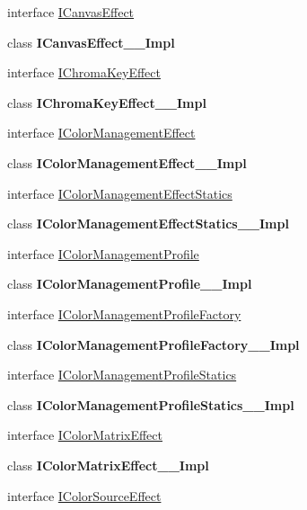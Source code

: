 \begin{DoxyCompactItemize}
\item 
interface \hyperlink{interface_microsoft_1_1_graphics_1_1_canvas_1_1_effects_1_1_i_canvas_effect}{I\+Canvas\+Effect}
\item 
class {\bfseries I\+Canvas\+Effect\+\_\+\+\_\+\+Impl}
\item 
interface \hyperlink{interface_microsoft_1_1_graphics_1_1_canvas_1_1_effects_1_1_i_chroma_key_effect}{I\+Chroma\+Key\+Effect}
\item 
class {\bfseries I\+Chroma\+Key\+Effect\+\_\+\+\_\+\+Impl}
\item 
interface \hyperlink{interface_microsoft_1_1_graphics_1_1_canvas_1_1_effects_1_1_i_color_management_effect}{I\+Color\+Management\+Effect}
\item 
class {\bfseries I\+Color\+Management\+Effect\+\_\+\+\_\+\+Impl}
\item 
interface \hyperlink{interface_microsoft_1_1_graphics_1_1_canvas_1_1_effects_1_1_i_color_management_effect_statics}{I\+Color\+Management\+Effect\+Statics}
\item 
class {\bfseries I\+Color\+Management\+Effect\+Statics\+\_\+\+\_\+\+Impl}
\item 
interface \hyperlink{interface_microsoft_1_1_graphics_1_1_canvas_1_1_effects_1_1_i_color_management_profile}{I\+Color\+Management\+Profile}
\item 
class {\bfseries I\+Color\+Management\+Profile\+\_\+\+\_\+\+Impl}
\item 
interface \hyperlink{interface_microsoft_1_1_graphics_1_1_canvas_1_1_effects_1_1_i_color_management_profile_factory}{I\+Color\+Management\+Profile\+Factory}
\item 
class {\bfseries I\+Color\+Management\+Profile\+Factory\+\_\+\+\_\+\+Impl}
\item 
interface \hyperlink{interface_microsoft_1_1_graphics_1_1_canvas_1_1_effects_1_1_i_color_management_profile_statics}{I\+Color\+Management\+Profile\+Statics}
\item 
class {\bfseries I\+Color\+Management\+Profile\+Statics\+\_\+\+\_\+\+Impl}
\item 
interface \hyperlink{interface_microsoft_1_1_graphics_1_1_canvas_1_1_effects_1_1_i_color_matrix_effect}{I\+Color\+Matrix\+Effect}
\item 
class {\bfseries I\+Color\+Matrix\+Effect\+\_\+\+\_\+\+Impl}
\item 
interface \hyperlink{interface_microsoft_1_1_graphics_1_1_canvas_1_1_effects_1_1_i_color_source_effect}{I\+Color\+Source\+Effect}
\item 

\end{DoxyCompactItemize}
